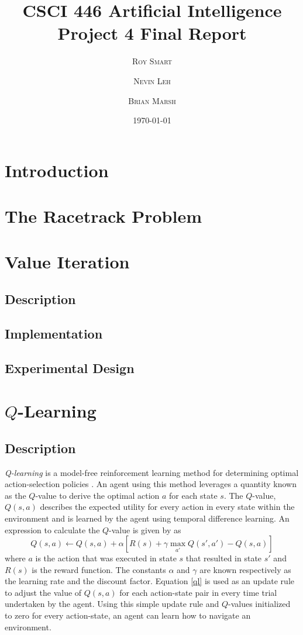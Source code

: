 \documentclass{article}
\title{\vspace{-15mm}\fontsize{24pt}{10pt}\selectfont\textbf{CSCI 446 Artificial Intelligence \\[2mm] Project 4 Final Report} } %
\date{\today}
\author{
\large
\textsc{Roy Smart} \and \textsc{Nevin Leh} \and \textsc{Brian Marsh}\\[2mm] %
}
\begin{document}
	\maketitle %
	\thispagestyle{fancy} %
	\normalsize

	\section{Introduction}
	\section{The Racetrack Problem}
	\section{Value Iteration}
		\subsection{Description}
		\subsection{Implementation}
		\subsection{Experimental Design}
	\section{$Q$-Learning}
		\subsection{Description}
			\textit{Q-learning} is a model-free reinforcement learning method for determining optimal action-selection policies \cite{ai}. An agent using this method leverages a quantity known as the $Q$-value to derive the optimal action $a$ for each state $s$. The $Q$-value, $Q(s,a)$ describes the expected utility for every action in every state within the environment and is learned by the agent using temporal difference learning.
			An expression to calculate the $Q$-value is given by \cite{ai} as
			\begin{equation}
				Q(s,a) \leftarrow Q(s,a) + \alpha \left[ R(s) + \gamma \max_{a'} Q(s',a') - Q(s,a) \right]
				\label{ql}
			\end{equation}
			where $a$ is the action that was executed in state $s$ that resulted in state $s'$ and $R(s)$ is the reward function. The constants $\alpha$ and $\gamma$ are known respectively as the learning rate and the discount factor. Equation \ref{ql} is used as an update rule to adjust the value of $Q(s,a)$ for each action-state pair in every time trial undertaken by the agent. Using this simple update rule and $Q$-values initialized to zero for every action-state, an agent can learn how to navigate an environment.
\end{document}

